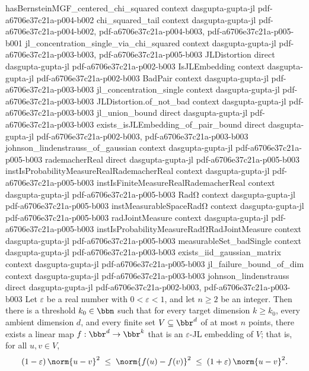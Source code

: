 \begin{theorem}
\proofstep
  {hasBernsteinMGF_centered_chi_squared}
  {context}
  {dasgupta-gupta-jl}
  {pdf-a6706e37c21a-p004-b002}
\proofstep
  {chi_squared_tail}
  {context}
  {dasgupta-gupta-jl}
  {pdf-a6706e37c21a-p004-b002,
    pdf-a6706e37c21a-p004-b003,
    pdf-a6706e37c21a-p005-b001}
\proofstep
  {jl_concentration_single_via_chi_squared}
  {context}
  {dasgupta-gupta-jl}
  {pdf-a6706e37c21a-p003-b003,
    pdf-a6706e37c21a-p005-b003}
\proofstep
  {JLDistortion}
  {direct}
  {dasgupta-gupta-jl}
  {pdf-a6706e37c21a-p002-b003}
\proofstep
  {IsJLEmbedding}
  {context}
  {dasgupta-gupta-jl}
  {pdf-a6706e37c21a-p002-b003}
\proofstep
  {BadPair}
  {context}
  {dasgupta-gupta-jl}
  {pdf-a6706e37c21a-p003-b003}
\proofstep
  {jl_concentration_single}
  {context}
  {dasgupta-gupta-jl}
  {pdf-a6706e37c21a-p003-b003}
\proofstep
  {JLDistortion.of_not_bad}
  {context}
  {dasgupta-gupta-jl}
  {pdf-a6706e37c21a-p003-b003}
\proofstep
  {jl_union_bound}
  {direct}
  {dasgupta-gupta-jl}
  {pdf-a6706e37c21a-p003-b003}
\proofstep
  {exists_isJLEmbedding_of_pair_bound}
  {direct}
  {dasgupta-gupta-jl}
  {pdf-a6706e37c21a-p002-b003,
    pdf-a6706e37c21a-p003-b003}
\proofstep
  {johnson_lindenstrauss_of_gaussian}
  {context}
  {dasgupta-gupta-jl}
  {pdf-a6706e37c21a-p005-b003}
\proofstep
  {rademacherReal}
  {direct}
  {dasgupta-gupta-jl}
  {pdf-a6706e37c21a-p005-b003}
\proofstep
  {instIsProbabilityMeasureRealRademacherReal}
  {context}
  {dasgupta-gupta-jl}
  {pdf-a6706e37c21a-p005-b003}
\proofstep
  {instIsFiniteMeasureRealRademacherReal}
  {context}
  {dasgupta-gupta-jl}
  {pdf-a6706e37c21a-p005-b003}
\proofstep
  {RadΩ}
  {context}
  {dasgupta-gupta-jl}
  {pdf-a6706e37c21a-p005-b003}
\proofstep
  {instMeasurableSpaceRadΩ}
  {context}
  {dasgupta-gupta-jl}
  {pdf-a6706e37c21a-p005-b003}
\proofstep
  {radJointMeasure}
  {context}
  {dasgupta-gupta-jl}
  {pdf-a6706e37c21a-p005-b003}
\proofstep
  {instIsProbabilityMeasureRadΩRadJointMeasure}
  {context}
  {dasgupta-gupta-jl}
  {pdf-a6706e37c21a-p005-b003}
\proofstep
  {measurableSet_badSingle}
  {context}
  {dasgupta-gupta-jl}
  {pdf-a6706e37c21a-p003-b003}
\proofstep
  {exists_iid_gaussian_matrix}
  {context}
  {dasgupta-gupta-jl}
  {pdf-a6706e37c21a-p005-b003}
\proofstep
  {jl_failure_bound_of_dim}
  {context}
  {dasgupta-gupta-jl}
  {pdf-a6706e37c21a-p003-b003}
\proofstep
  {johnson_lindenstrauss}
  {direct}
  {dasgupta-gupta-jl}
  {pdf-a6706e37c21a-p002-b003,
    pdf-a6706e37c21a-p003-b003}
Let $\varepsilon$ be a real number with $0 < \varepsilon < 1$, and let $n \ge 2$ be an
integer. Then there is a threshold $k_0 \in \bbn$ such that for every target dimension
$k \ge k_0$, every ambient dimension $d$, and every finite set $V \subseteq \bbr^d$ of
at most $n$ points, there exists a linear map $f : \bbr^d \to \bbr^k$ that is an
$\varepsilon$-JL embedding of $V$; that is, for all $u, v \in V$,
\[
(1 - \varepsilon)\,\norm{u - v}^2 \;\le\; \norm{f(u) - f(v)}^2 \;\le\; (1 +
\varepsilon)\,\norm{u - v}^2.
\]
\end{theorem}

